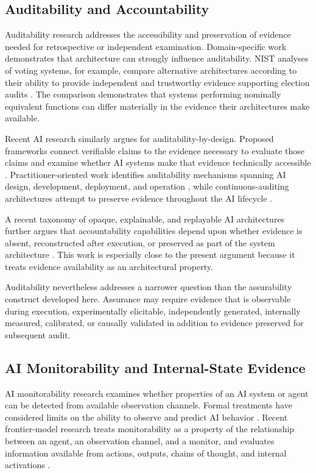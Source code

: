 \subsection{Auditability and Accountability}

Auditability research addresses the accessibility and preservation of evidence needed for retrospective or independent examination.
Domain-specific work demonstrates that architecture can strongly influence auditability.
NIST analyses of voting systems, for example, compare alternative architectures according to their ability to provide independent and trustworthy evidence supporting election audits \cite{nistVotingAuditability}. The comparison demonstrates that systems performing nominally equivalent functions can differ materially in the evidence their architectures make available.

Recent AI research similarly argues for auditability-by-design.
Proposed frameworks connect verifiable claims to the evidence necessary to evaluate those claims and examine whether AI systems make that evidence technically accessible \cite{fernsel2024auditability}. Practitioner-oriented work identifies auditability mechanisms spanning AI design, development, deployment, and operation \cite{li2025auditability}, while continuous-auditing architectures attempt to preserve evidence throughout the AI lifecycle \cite{auditmai2024}.

A recent taxonomy of opaque, explainable, and replayable AI architectures further argues that accountability capabilities depend upon whether evidence is absent, reconstructed after execution, or preserved as part of the system architecture \cite{accountabilityArchitectures2026}. This work is especially close to the present argument because it treats evidence availability as an architectural property.

Auditability nevertheless addresses a narrower question than the assurability construct developed here.
Assurance may require evidence that is observable during execution, experimentally elicitable, independently generated, internally measured, calibrated, or causally validated in addition to evidence preserved for subsequent audit.

\subsection{AI Monitorability and Internal-State Evidence}

AI monitorability research examines whether properties of an AI system or agent can be detected from available observation channels.
Formal treatments have considered limits on the ability to observe and predict AI behavior \cite{yampolskiy2024monitorability}.
Recent frontier-model research treats monitorability as a property of the relationship between an agent, an observation channel,
and a monitor, and evaluates information available from actions, outputs, chains of thought, and internal activations \cite{openai2025cotmonitorability}.

